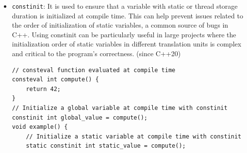 \documentclass[12pt]{article}
\begin{document}
\begin{itemize}
\begin{lstlisting}
    \end{lstlisting}
    \item \texttt{constinit}: It is used to ensure that a variable with static or thread storage duration is initialized at compile time. This can help prevent issues related to the order of initialization of static variables, a common source of bugs in C++. Using constinit can be particularly useful in large projects where the initialization order of static variables in different translation units is complex and critical to the program's correctness. (since C++20)
    \begin{lstlisting}
// consteval function evaluated at compile time
consteval int compute() {
    return 42;
}
// Initialize a global variable at compile time with constinit
constinit int global_value = compute();
void example() {
    // Initialize a static variable at compile time with constinit
    static constinit int static_value = compute();


\end{lstlisting}
\end{itemize}
\end{document}
